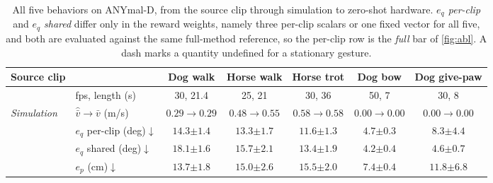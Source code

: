 \documentclass[letterpaper, 10 pt, conference]{ieeeconf}
\newcommand{\pmv}[2]{#1{\scriptstyle \pm #2}}
\begin{document}
\begin{table}[t!]
\centering
\caption{All five behaviors on ANYmal-D, from the source clip through simulation to zero-shot hardware. \textit{$e_q$ per-clip} and \textit{$e_q$ shared} differ only in the reward weights, namely three per-clip scalars or one fixed vector for all five, and both are evaluated against the same full-method reference, so the per-clip row is the \textit{full} bar of \autoref{fig:abl}. A dash marks a quantity undefined for a stationary gesture.
}
\label{tab:all}
\begin{tabular*}{\linewidth}{@{\extracolsep{\fill}}llccccc@{}}
\toprule
Source clip & & Dog walk & Horse walk & Horse trot & Dog bow & Dog give-paw \\
\midrule
 & fps, length (s) & 30, 21.4 & 25, 21 & 30, 36 & 50, 7 & 30, 8 \\
\midrule
\multirow{6}{2cm}{\textit{Simulation}}
& $\hat{\bar v}\to\bar v$ (m/s) & $0.29\to0.29$ & $0.48\to0.55$ & $0.58\to0.58$ & $0.00\to0.00$ & $0.00\to0.00$ \\
& $e_q$ per-clip (deg)$\downarrow$ & $\pmv{14.3}{1.4}$ & $\pmv{13.3}{1.7}$ & $\pmv{11.6}{1.3}$ & $\pmv{4.7}{0.3}$ & $\pmv{8.3}{4.4}$ \\
& $e_q$ shared (deg)$\downarrow$ & $\pmv{18.1}{1.6}$ & $\pmv{15.7}{2.1}$ & $\pmv{13.4}{1.9}$ & $\pmv{4.2}{0.4}$ & $\pmv{4.6}{0.7}$ \\
& $e_p$ (cm)$\downarrow$ & $\pmv{13.7}{1.8}$ & $\pmv{15.0}{2.6}$ & $\pmv{15.5}{2.0}$ & $\pmv{7.4}{0.4}$ & $\pmv{11.8}{6.8}$ \\

\end{tabular*}
\end{table}
\end{document}
